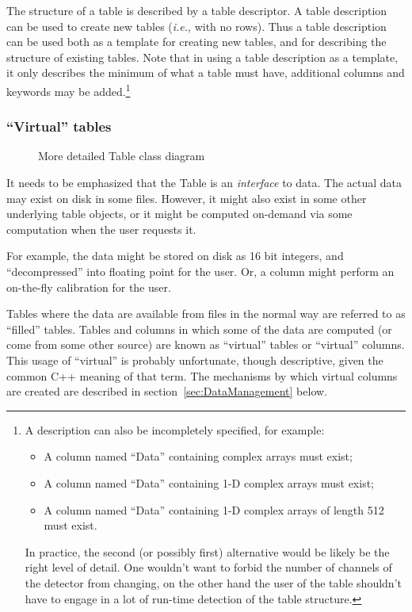 The structure of a table is described by a table descriptor. A table
description can be used to create new tables ({\em i.e.}, with no rows). Thus
a table description can be used both as a template for creating new
tables, and for describing the structure of existing tables. Note that
in using a table description as a template, it only describes the
minimum of what a table must have, additional columns and keywords may
be added.\footnote{
A description can also be incompletely specified, for example:
\begin{itemize}
\item A column named ``Data'' containing complex arrays must exist;
\item A column named ``Data'' containing 1-D complex arrays must exist;
\item A column named ``Data'' containing 1-D complex arrays of length
      512 must exist.
\end{itemize}
In practice, the second (or possibly first) alternative would be
likely be the right level of detail. One wouldn't want to forbid the
number of channels of the detector from changing, on the other hand
the user of the table shouldn't have to engage in a lot of run-time
detection of the table structure.}


\subsubsection{``Virtual'' tables}
\label{sec:VirtualTables}
\begin{figure}
\epsfverbosetrue
\epsfysize=7.0in
\caption{More detailed Table class diagram}
\label{fig:DbTable1}
\end{figure}

It needs to be emphasized that the Table is an {\em interface} to data.
The actual data may exist on disk in some files. However, it might also
exist in some other underlying table objects, or it might be computed
on-demand via some computation when the user requests it.

For example, the data might be stored on disk as 16 bit integers, and
``decompressed'' into floating point for the user. Or, a column might
perform an on-the-fly calibration for the user.

Tables where the data are available from files in the normal way are
referred to as ``filled'' tables. Tables and columns in which some of
the data are computed (or come from some other source) are known as
``virtual'' tables or ``virtual'' columns. This usage of ``virtual''
is probably unfortunate, though descriptive, given the common C++
meaning of that term. The mechanisms by which virtual columns are
created are described in section~\ref{sec:DataManagement} below.

